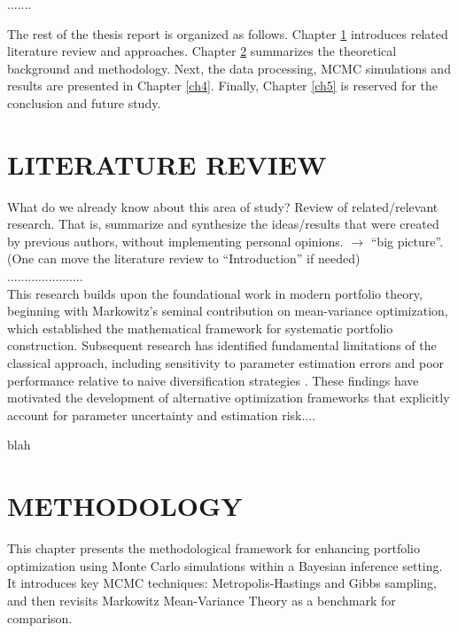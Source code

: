 \documentclass[12pt,a4paper,oneside]{book}
\theoremstyle{definition}
\begin{document}
.......

  The rest of the thesis report is organized as follows. Chapter \ref{ch2} introduces related literature review and approaches. Chapter \ref{ch3} summarizes the theoretical background and methodology. Next, the data processing, MCMC simulations and results are presented in Chapter \ref{ch4}. Finally, Chapter \ref{ch5} is reserved for the conclusion and future study. 
  

\chapter{LITERATURE REVIEW}
\label{ch2}

What do we already know about this area of study? {\color{blue}Review of related/relevant research.} That is, summarize and synthesize the ideas/results that were created by previous authors, {\color{blue}without implementing personal opinions}. $\to$ ``big picture''.\\
(One can move the literature review to ``Introduction'' if needed)\\



......................\\

This research builds upon the foundational work in modern portfolio theory, beginning with Markowitz's seminal contribution \cite{markowitz1952} on mean-variance optimization, which established the mathematical framework for systematic portfolio construction. Subsequent research has identified fundamental limitations of the classical approach, including sensitivity to parameter estimation errors \cite{michaud1989, chopraZiemba1993} and poor performance relative to naive diversification strategies \cite{demiguel2009}. These findings have motivated the development of alternative optimization frameworks that explicitly account for parameter uncertainty and estimation risk....

blah



\chapter{METHODOLOGY}
\label{ch3}

This chapter presents the methodological framework for enhancing portfolio optimization using Monte Carlo simulations within a Bayesian inference setting. It introduces key MCMC techniques: Metropolis-Hastings and Gibbs sampling, and then revisits Markowitz Mean-Variance Theory as a benchmark for comparison.
\end{document}
